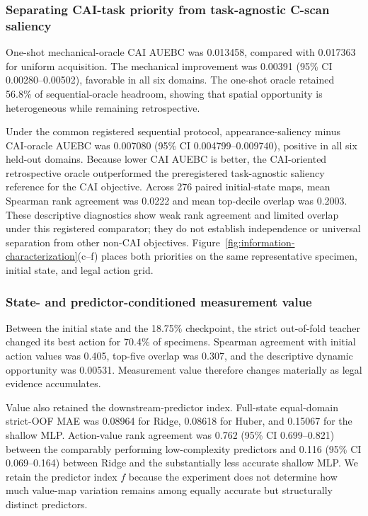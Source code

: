 \documentclass[preprint,12pt]{elsarticle}
\begin{document}
\subsubsection{Separating CAI-task priority from task-agnostic C-scan saliency}
\label{sec:results-task-conditioned}

One-shot mechanical-oracle CAI AUEBC was 0.013458, compared with 0.017363 for
uniform acquisition. The mechanical improvement was 0.00391 (95\% CI
0.00280--0.00502), favorable in all six domains. The one-shot oracle retained
56.8\% of sequential-oracle headroom, showing that spatial opportunity is
heterogeneous while remaining retrospective.

Under the common registered sequential protocol, appearance-saliency minus
CAI-oracle AUEBC was 0.007080 (95\% CI 0.004799--0.009740), positive in all six
held-out domains. Because lower CAI AUEBC is better, the CAI-oriented
retrospective oracle outperformed the preregistered task-agnostic saliency
reference for the CAI objective. Across 276 paired initial-state maps, mean
Spearman rank agreement was 0.0222 and mean top-decile overlap was 0.2003.
These descriptive diagnostics show weak rank agreement and limited overlap
under this registered comparator; they do not establish independence or
universal separation from other non-CAI objectives.
Figure~\ref{fig:information-characterization}(c--f) places both priorities on
the same representative specimen, initial state, and legal action grid.

\subsubsection{State- and predictor-conditioned measurement value}
\label{sec:results-state-predictor}

Between the initial state and the 18.75\% checkpoint, the strict out-of-fold
teacher changed its best action for 70.4\% of specimens. Spearman agreement
with initial action values was 0.405, top-five overlap was 0.307, and the
descriptive dynamic opportunity was 0.00531. Measurement value therefore
changes materially as legal evidence accumulates.

Value also retained the downstream-predictor index. Full-state equal-domain
strict-OOF MAE was 0.08964 for Ridge, 0.08618 for Huber, and 0.15067 for the
shallow MLP. Action-value rank agreement was 0.762 (95\% CI 0.699--0.821)
between the comparably performing low-complexity predictors and 0.116 (95\%
CI 0.069--0.164) between Ridge and the substantially less accurate shallow
MLP. We retain the predictor index $f$ because the experiment does not
determine how much value-map variation remains among equally accurate but
structurally distinct predictors.
\end{document}
